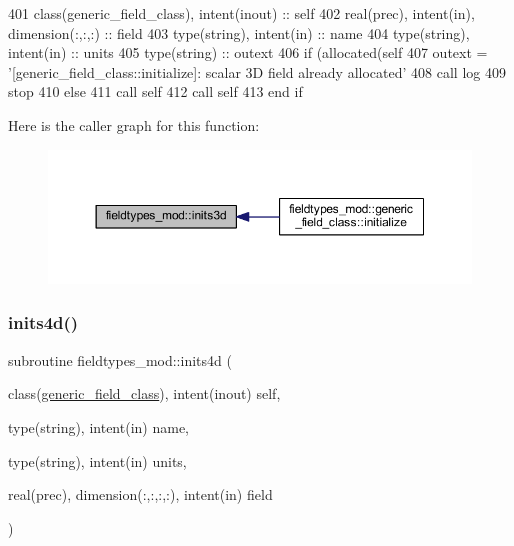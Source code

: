 \begin{DoxyCode}
401     \textcolor{keywordtype}{class}(generic\_field\_class), \textcolor{keywordtype}{intent(inout)} :: self
402     \textcolor{keywordtype}{real(prec)}, \textcolor{keywordtype}{intent(in)}, \textcolor{keywordtype}{dimension(:,:,:)} :: field
403     \textcolor{keywordtype}{type}(string), \textcolor{keywordtype}{intent(in)} :: name
404     \textcolor{keywordtype}{type}(string), \textcolor{keywordtype}{intent(in)} :: units
405     \textcolor{keywordtype}{type}(string) :: outext
406     \textcolor{keywordflow}{if} (\textcolor{keyword}{allocated}(self%
407         outext = \textcolor{stringliteral}{'[generic\_field\_class::initialize]: scalar 3D field already allocated'}
408         \textcolor{keyword}{call }log%
409         stop
410     \textcolor{keywordflow}{else}
411         \textcolor{keyword}{call }self%
412         \textcolor{keyword}{call }self%
413 \textcolor{keywordflow}{    end if}
\end{DoxyCode}
Here is the caller graph for this function\+:\nopagebreak
\begin{figure}[H]
\begin{center}
\leavevmode
\includegraphics[width=350pt]{namespacefieldtypes__mod_a750ce2c729d98ea7031c839a3a5ebd7c_icgraph}
\end{center}
\end{figure}
\mbox{\label{namespacefieldtypes__mod_a1987bd94293cfd9e35016ac5992501cd}} 
\subsubsection{\texorpdfstring{inits4d()}{inits4d()}}
{\footnotesize\ttfamily subroutine fieldtypes\+\_\+mod\+::inits4d (\begin{DoxyParamCaption}\item[{class(\mbox{\hyperlink{structfieldtypes__mod_1_1generic__field__class}{generic\+\_\+field\+\_\+class}}), intent(inout)}]{self,  }\item[{type(string), intent(in)}]{name,  }\item[{type(string), intent(in)}]{units,  }\item[{real(prec), dimension(\+:,\+:,\+:,\+:), intent(in)}]{field }\end{DoxyParamCaption})\hspace{0.3cm}{\ttfamily [private]}}




